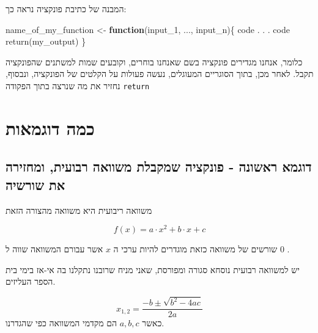 \documentclass[
]{book}
\newenvironment{Shaded}{\begin{snugshade}}{\end{snugshade}}
\newcommand{\ControlFlowTok}[1]{\textcolor[rgb]{0.13,0.29,0.53}{\textbf{#1}}}
\newcommand{\FunctionTok}[1]{\textcolor[rgb]{0.00,0.00,0.00}{#1}}
\newcommand{\NormalTok}[1]{#1}
\newcommand{\OtherTok}[1]{\textcolor[rgb]{0.56,0.35,0.01}{#1}}
\begin{document}
המבנה של כתיבת פונקציה נראה כך:

\begin{Shaded}
\begin{Highlighting}[]
\NormalTok{name\_of\_my\_function }\OtherTok{\textless{}{-}} \ControlFlowTok{function}\NormalTok{(input\_1, ..., input\_n)\{}
\NormalTok{  code}
\NormalTok{  .}
\NormalTok{  .}
\NormalTok{  .}
\NormalTok{  code}
  \FunctionTok{return}\NormalTok{(my\_output)}
\NormalTok{\}}
\end{Highlighting}
\end{Shaded}

כלומר,
אנחנו מגדירים פונקציה בשם שאנחנו בוחרים, וקובעים שמות למשתנים שהפונקציה תקבל.
לאחר מכן, בתוך הסוגריים המעוגלים, נעשה פעולות על הקלטים של הפונקציה,
ונבסוף, נחזיר את מה שנרצה בתוך הפקודה
\texttt{return}

\hypertarget{ux5dbux5deux5d4-ux5d3ux5d5ux5d2ux5deux5d0ux5d5ux5ea}{%
\section{כמה דוגמאות}\label{ux5dbux5deux5d4-ux5d3ux5d5ux5d2ux5deux5d0ux5d5ux5ea}}

\hypertarget{ux5d3ux5d5ux5d2ux5deux5d0-ux5e8ux5d0ux5e9ux5d5ux5e0ux5d4---ux5e4ux5d5ux5e0ux5e7ux5e6ux5d9ux5d4-ux5e9ux5deux5e7ux5d1ux5dcux5ea-ux5deux5e9ux5d5ux5d5ux5d0ux5d4-ux5e8ux5d1ux5d5ux5e2ux5d9ux5ea-ux5d5ux5deux5d7ux5d6ux5d9ux5e8ux5d4-ux5d0ux5ea-ux5e9ux5d5ux5e8ux5e9ux5d9ux5d4}{%
\subsection{דוגמא ראשונה - פונקציה שמקבלת משוואה רבועית, ומחזירה את שורשיה}\label{ux5d3ux5d5ux5d2ux5deux5d0-ux5e8ux5d0ux5e9ux5d5ux5e0ux5d4---ux5e4ux5d5ux5e0ux5e7ux5e6ux5d9ux5d4-ux5e9ux5deux5e7ux5d1ux5dcux5ea-ux5deux5e9ux5d5ux5d5ux5d0ux5d4-ux5e8ux5d1ux5d5ux5e2ux5d9ux5ea-ux5d5ux5deux5d7ux5d6ux5d9ux5e8ux5d4-ux5d0ux5ea-ux5e9ux5d5ux5e8ux5e9ux5d9ux5d4}}

משוואה ריבועית היא משוואה מהצורה הזאת

\[
f(x) = a \cdot x^2 + b \cdot x + c
\]

שורשים של משוואה כזאת מוגדרים להיות ערכי ה
\(x\)
אשר עבורם המשוואה שווה ל
\(0\)
.

יש למשוואה רבועית נוסחא סגורה ומפורסת, שאני מניח שרובנו נתקלנו בה אי-אז בימי בית הספר העליזים.

\[
x_{1,2} = \frac{-b \pm \sqrt{b^2 - 4ac}}{2a}
\]
כאשר
\(a, b, c\)
הם מקדמי המשוואה כפי שהגדרנו.
\end{document}
